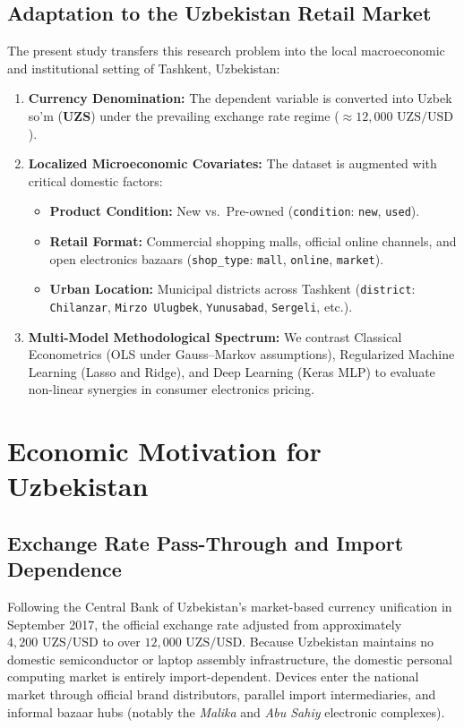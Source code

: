 \documentclass[11pt, a4paper]{article}
\begin{document}
\subsection{Adaptation to the Uzbekistan Retail Market}
The present study transfers this research problem into the local macroeconomic and institutional setting of Tashkent, Uzbekistan:
\begin{enumerate}
    \item \textbf{Currency Denomination:} The dependent variable is converted into Uzbek so’m (\textbf{UZS}) under the prevailing exchange rate regime ($\approx 12,000\text{ UZS/USD}$).
    \item \textbf{Localized Microeconomic Covariates:} The dataset is augmented with critical domestic factors:
    \begin{itemize}
        \item \textbf{Product Condition:} New vs.\ Pre-owned (\texttt{condition}: \texttt{new}, \texttt{used}).
        \item \textbf{Retail Format:} Commercial shopping malls, official online channels, and open electronics bazaars (\texttt{shop\_type}: \texttt{mall}, \texttt{online}, \texttt{market}).
        \item \textbf{Urban Location:} Municipal districts across Tashkent (\texttt{district}: \texttt{Chilanzar}, \texttt{Mirzo Ulugbek}, \texttt{Yunusabad}, \texttt{Sergeli}, etc.).
    \end{itemize}
    \item \textbf{Multi-Model Methodological Spectrum:} We contrast Classical Econometrics (OLS under Gauss--Markov assumptions), Regularized Machine Learning (Lasso and Ridge), and Deep Learning (Keras MLP) to evaluate non-linear synergies in consumer electronics pricing.
\end{enumerate}

\section{Economic Motivation for Uzbekistan}

\subsection{Exchange Rate Pass-Through and Import Dependence}
Following the Central Bank of Uzbekistan's market-based currency unification in September 2017, the official exchange rate adjusted from approximately $4,200\text{ UZS/USD}$ to over $12,000\text{ UZS/USD}$. Because Uzbekistan maintains no domestic semiconductor or laptop assembly infrastructure, the domestic personal computing market is entirely import-dependent. Devices enter the national market through official brand distributors, parallel import intermediaries, and informal bazaar hubs (notably the \textit{Malika} and \textit{Abu Sahiy} electronic complexes). 
\end{document}
